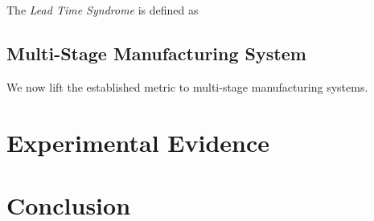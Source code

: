 \documentclass[mnsc]{informs3}
\begin{document}
\begin{definition}
  The \emph{Lead Time Syndrome} is defined as
\end{definition}



\subsection{Multi-Stage Manufacturing System}
\label{subsec:Multi-Stage_Manufacturing_System}


We now lift the established metric to multi-stage manufacturing systems.


\section{Experimental Evidence}
\label{sec:Experimental_Evidence}


\section{Conclusion}
\label{sec:Conclusion}




\end{document}
